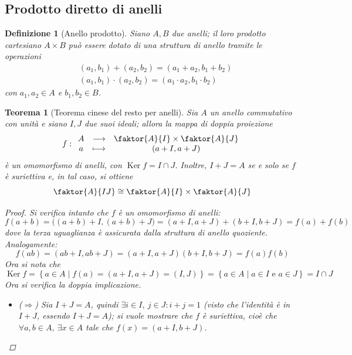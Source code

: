 \documentclass[12pt]{scrartcl}
\theoremstyle{style}
\newtheorem{definizione}{Definizione}[section]
\newtheorem{teorema}{Teorema}[section]
\numberwithin{equation}{subsection}
\begin{document}
\subsection{Prodotto diretto di anelli}
\begin{definizione}
	[Anello prodotto]
	Siano $A,B$ due anelli; il loro prodotto cartesiano $A\times B$ pu\`o essere dotato di una struttura di anello tramite le operazioni
	\[
	\begin{split}
		&(a_1,b_1)+(a_2,b_2) = (a_1+a_2,b_1+b_2) \\
		& (a_1,b_1) \cdot (a_2,b_2) = (a_1\cdot a_2, b_1\cdot b_2)
	\end{split}
	\] 
	con $a_1,a_2\in A$ e $b_1,b_2 \in B$.
\end{definizione}
\begin{teorema}
	[Teorema cinese del resto per anelli]
	Sia $A$ un anello commutativo con unit\`a e siano $I,J$ due suoi ideali; allora la mappa di doppia proiezione
	\[
	f :
	\begin{array}
		{c c c}
		A&\longrightarrow & \faktor{A}{I} \times \faktor{A}{J}\\
		a&\longmapsto &(a+I,a+J)
	\end{array}
	\] 
	\`e un omomorfismo di anelli, con $\operatorname{Ker} f = I\cap J$.
	Inoltre, $I+J = A$ se e solo se $f$ \`e suriettiva e, in tal caso, si ottiene
	\[
		\faktor{A}{IJ} \cong \faktor{A}{I} \times \faktor{A}{J}
	\] 
	\begin{proof}
		Si verifica intanto che $f$ \`e un omomorfismo di anelli:
		\[
		f(a+b) = \big((a+b) +I, (a+b) + J\big) = (a+I,a+J) + (b+I,b+J) = f(a)+f(b)
		\] 
		dove la terza uguaglianza \`e assicurata dalla struttura di anello quoziente. 
		Analogamente:
		\[
		f(ab) = (ab + I, ab+ J)  = (a+I,a+J)(b+I,b+J) = f(a)f(b)
		\] 
	Ora si nota che 
	\[
	\operatorname{Ker} f=\left\{ a \in A  \mid f(a) = (a+I,a+J) = (I,J) \right\} =\left\{ a \in A  \mid a \in I\text{ e } a \in J \right\} = I\cap J
	\] 
	Ora si verifica la doppia implicazione.
	\begin{itemize}
		\item ($\Rightarrow $) Sia $I+J = A$, quindi $\exists i\in I, \ j \in J : i+j = 1$ (visto che l'identit\`a \`e in $I+J$, essendo $I+J=A$); si vuole mostrare che $f$ \`e suriettiva, cio\`e che $\forall a,b \in A, \ \exists x \in A $ tale che $f(x) = (a+I,b+J)$.


\end{itemize}
\end{proof}
\end{teorema}
\end{document}
